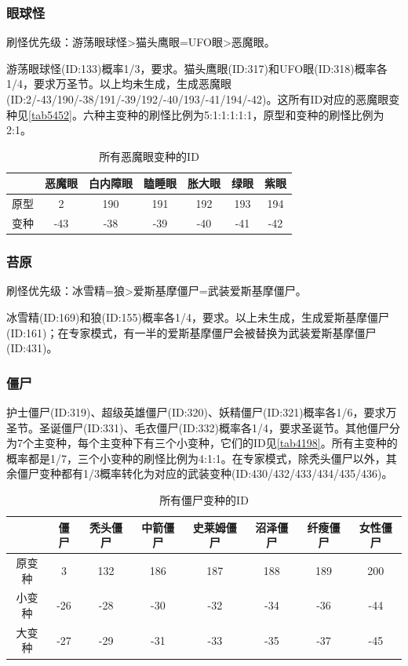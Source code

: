\subsubsection{眼球怪}\label{app15}
刷怪优先级：游荡眼球怪>猫头鹰眼=UFO眼>恶魔眼。

游荡眼球怪(ID:133)概率1/3，要求。猫头鹰眼(ID:317)和UFO眼(ID:318)概率各1/4，要求万圣节。以上均未生成，生成恶魔眼(ID:2/-43/190/-38/191/-39/192/-40/193/-41/194/-42)。这所有ID对应的恶魔眼变种见\autoref{tab5452}。六种主变种的刷怪比例为5:1:1:1:1:1，原型和变种的刷怪比例为2:1。

\begin{table}[!ht]
    \centering
    \begin{tabular}{c|cccccc}
         &恶魔眼&白内障眼&瞌睡眼&胀大眼&绿眼&紫眼\\\hline
         原型&2&190&191&192&193&194\\
         变种&-43&-38&-39&-40&-41&-42
    \end{tabular}
    \caption{所有恶魔眼变种的ID}
    \label{tab5452}
\end{table}

\subsubsection{苔原}\label{app16}
刷怪优先级：冰雪精=狼>爱斯基摩僵尸=武装爱斯基摩僵尸。

冰雪精(ID:169)和狼(ID:155)概率各1/4，要求。以上未生成，生成爱斯基摩僵尸(ID:161)；在专家模式，有一半的爱斯基摩僵尸会被替换为武装爱斯基摩僵尸(ID:431)。

\subsubsection{僵尸}\label{app17}
护士僵尸(ID:319)、超级英雄僵尸(ID:320)、妖精僵尸(ID:321)概率各1/6，要求万圣节。圣诞僵尸(ID:331)、毛衣僵尸(ID:332)概率各1/4，要求圣诞节。其他僵尸分为7个主变种，每个主变种下有三个小变种，它们的ID见\autoref{tab4198}。所有主变种的概率都是1/7，三个小变种的刷怪比例为4:1:1。在专家模式，除秃头僵尸以外，其余僵尸变种都有1/3概率转化为对应的武装变种(ID:430/432/433/434/435/436)。

\begin{table}[!ht]
    \centering
    \begin{tabular}{c|ccccccc}
         &僵尸&秃头僵尸&中箭僵尸&史莱姆僵尸&沼泽僵尸&纤瘦僵尸&女性僵尸\\\hline
         原变种&3  &132&186&187&188&189&200\\
         小变种&-26&-28&-30&-32&-34&-36&-44\\
         大变种&-27&-29&-31&-33&-35&-37&-45
    \end{tabular}
    \caption{所有僵尸变种的ID}
    \label{tab4198}
\end{table}

